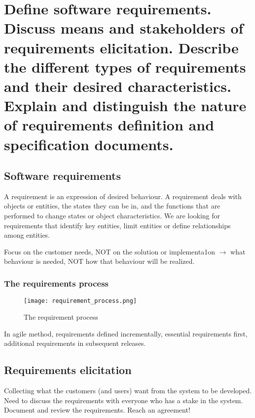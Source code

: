 \clearpage{}
\section{Define software requirements. Discuss means and stakeholders of
requirements elicitation. Describe the different types of requirements and
their desired characteristics. Explain and distinguish the nature of
requirements definition and specification documents.}

\subsection{Software requirements}

A requirement is an expression of desired behaviour. A requirement deals with objects or
entities, the states they can be in, and the functions that are performed to change states or
object characteristics. We are looking for requirements that identify key entities, limit
entities or define relationships among entities. \newline

Focus on the customer needs, NOT on the solution or implementa1on $\rightarrow$ what behaviour is
needed, NOT how that behaviour will be realized. \newline

\subsubsection{The requirements process}

\begin{figure}[!ht]
    \centering
    \texttt{[image: requirement\_process.png]}
    \caption{The requirement process}
\end{figure}

In agile method, requirements defined incrementally, essential requirements first,
additional requirements in subsequent releases.

\subsection{Requirements elicitation}

Collecting what the customers (and users) want from the system to be developed.
Need to discuss the requirements with everyone who has a stake in the system.
\newline
Document and review the requirements. \newline
Reach an agreement!

